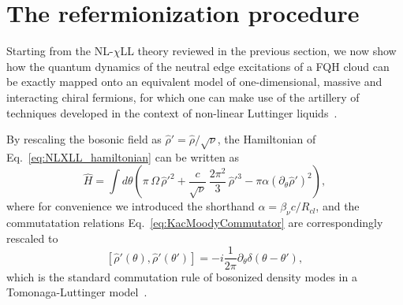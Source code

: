 \documentclass[twocolumn,pra,superscriptaddress,noshowpacs]{revtex4}
\newcommand{\nlchill}{NL-$\chi$LL }
\begin{document}
\section{The refermionization procedure}\label{sec:refermionization}

Starting from the \nlchill theory reviewed in the previous section, we now show how the quantum dynamics of the neutral edge excitations of a FQH cloud can be exactly mapped onto an equivalent model of one-dimensional, massive and interacting chiral fermions, for which 
one can make use of the artillery of techniques developed in the context of non-linear Luttinger liquids~\cite{ImambekovGlazman_Science_2009, ImambekovGlazman_RMP_2012}.%

By rescaling the bosonic field as $\hat\rho'=\hat\rho / \sqrt{\nu}$, the Hamiltonian of Eq.~\eqref{eq:NLXLL_hamiltonian} can be written as
\begin{equation}
    \label{eq:NLXLL_hamiltonian_rescaled}
	\hat{H}=\int d\theta\left(\pi\,\Omega\,\hat{\rho}'^2+\frac{c}{\sqrt{\nu}}\,\frac{2\pi^2}{3}\,\hat{\rho}'^3-\pi\alpha\left(\partial_\theta\hat{\rho}'\right)^2\right),
\end{equation}
where for convenience we introduced the shorthand $\alpha=\beta_\nu {c}/{R_{cl}}$, and the commutatation relations Eq.~\eqref{eq:KacMoodyCommutator} are correspondingly rescaled to
\begin{equation}
    \label{eq:KacMoodyCommutator_rescaled}
    [\hat{\rho}'(\theta),\hat{\rho}'(\theta')]=-i \frac{1}{2\pi} \partial_\theta\delta(\theta-\theta'),
\end{equation}
which is the standard commutation rule of bosonized density modes in a Tomonaga-Luttinger model~\cite{Haldane_JPC_1981, Giamarchi_QP1D_2004}. 
\end{document}
